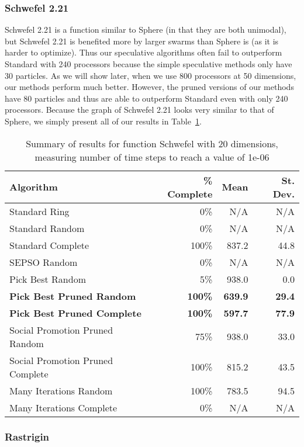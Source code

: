 \documentclass[smallcondensed]{svjour3}
\newcommand{\tabref}[1]{Table~\ref{tab:#1}}
\begin{document}
\subsubsection{Schwefel 2.21}

Schwefel 2.21 is a function similar to Sphere (in that they are both unimodal),
but Schwefel 2.21 is benefited more by larger swarms than Sphere is (as it is
harder to optimize).  Thus our speculative algorithms often fail to outperform
Standard with 240 processors because the simple speculative methods only have
30 particles.  As we will show later, when we use 800 processors at 50
dimensions, our methods perform much better.  However, the pruned versions of
our methods have 80 particles and thus are able to outperform Standard even
with only 240 processors.  Because the graph of Schwefel 2.21 looks very
similar to that of Sphere, we simply present all of our results in
\tabref{schwefel-20}.

\begin{table}
  \caption{Summary of results for function Schwefel with 20 dimensions,
  measuring number of time steps to reach a value of 1e-06}
  \label{tab:schwefel-20}
  \centering
  \begin{tabular}{|l|r|r|r|}
  \hline
  Algorithm&\% Complete&Mean&St. Dev.\\
  \hline
  \hline
  Standard Ring&0\%&N/A&N/A\\
  \hline
  Standard Random&0\%&N/A&N/A\\
  \hline
  Standard Complete&100\%&837.2&44.8\\
  \hline
  SEPSO Random&0\%&N/A&N/A\\
  \hline
  Pick Best Random&5\%&938.0&0.0\\
  \hline
  \textbf{Pick Best Pruned Random}&\textbf{100\%}&\textbf{639.9}&\textbf{29.4}\\
  \hline
  \textbf{Pick Best Pruned Complete}&\textbf{100\%}&\textbf{597.7}&
	\textbf{77.9}\\
  \hline
  Social Promotion Pruned Random&75\%&938.0&33.0\\
  \hline
  Social Promotion Pruned Complete&100\%&815.2&43.5\\
  \hline
  Many Iterations Random&100\%&783.5&94.5\\
  \hline
  Many Iterations Complete&0\%&N/A&N/A\\
  \hline
  \end{tabular}
\end{table}


\subsubsection{Rastrigin}
\end{document}
